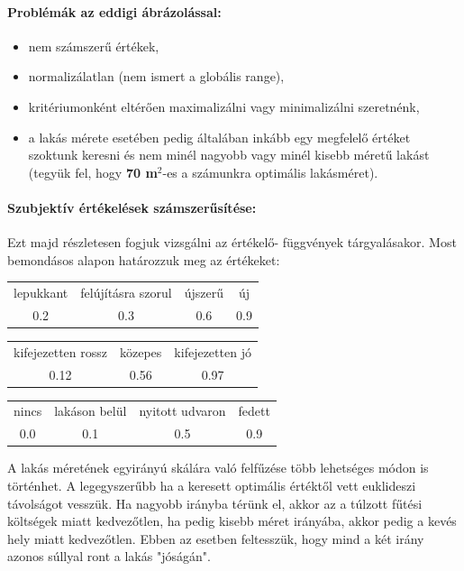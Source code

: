 \documentclass[a4paper,12pt]{article}
\begin{document}
\paragraph{Problémák az eddigi ábrázolással:}
\begin{itemize}
\item nem számszerű értékek,
\item normalizálatlan (nem ismert a globális range),
\item kritériumonként eltérően maximalizálni vagy minimalizálni szeretnénk, 
\item a lakás mérete esetében pedig általában inkább egy megfelelő értéket szoktunk keresni és nem minél nagyobb vagy minél kisebb méretű lakást (tegyük fel, hogy \textbf{70 m$^2$}-es a számunkra optimális lakásméret).
\end{itemize}
\paragraph{Szubjektív értékelések számszerűsítése:}

Ezt majd részletesen fogjuk vizsgálni az értékelő- függvények tárgyalásakor. Most bemondásos alapon határozzuk meg az értékeket:

\begin{center}
\begin{tabular}{cccc}
lepukkant& felújításra szorul& újszerű & új \\
0.2 &0.3&0.6&0.9\\
\end{tabular}

\begin{tabular}{ccc}
 kifejezetten rossz& közepes & kifejezetten jó \\
 0.12&0.56&0.97\\
\end{tabular}

\begin{tabular}{cccc}
 nincs & lakáson belül & nyitott udvaron & fedett \\
 0.0 & 0.1 & 0.5 & 0.9 \\
\end{tabular}

\end{center}

A lakás méretének egyirányú skálára való felfűzése több lehetséges módon is történhet. A legegyszerűbb ha a keresett optimális értéktől vett euklideszi távolságot vesszük. Ha nagyobb irányba térünk el, akkor az a túlzott fűtési költségek miatt kedvezőtlen, ha pedig kisebb méret irányába, akkor pedig a kevés hely miatt kedvezőtlen. Ebben az esetben feltesszük, hogy mind a két irány azonos súllyal ront a lakás "jóságán".
\end{document}
